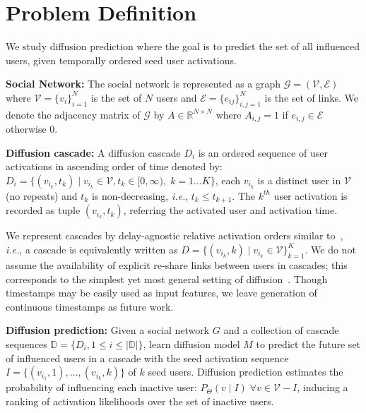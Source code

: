 \documentclass[sigconf]{acmart}
\def\gE{{\mathcal{E}}}
\def\gG{{\mathcal{G}}}
\def\gV{{\mathcal{V}}}
\def\sD{{\mathbb{D}}}
\def\sR{{\mathbb{R}}}
\begin{document}
\section{Problem Definition}
\label{sec:defn}
We study diffusion prediction where the goal is to predict the set of all influenced users, given temporally ordered seed user activations.
\begin{definition}\textbf{Social Network:} The social network is represented as a graph $\gG = (\gV,\gE)$ where $\gV = \{ v_i\}_{i=1}^N$ is the set of $N$ users and $\gE = \{ e_{ij} \}_{i,j=1}^N$ is the set of links. We denote the adjacency matrix of $\gG$ by $A \in \sR^{N \times N}$ where $A_{i,j} = 1$ if $e_{i,j} \in \gE$ otherwise 0.
\end{definition}
\vspace{-8pt}
\begin{definition}\textbf{Diffusion cascade:} A diffusion cascade $D_i$ is an ordered sequence of user activations in ascending order of time denoted by: $D_i = \{ (v_{i_k}, t_k) \mid v_{i_k} \in \gV, t_k \in [0, \infty), \; k = 1\dots K\}$, each $v_{i_k}$ is a distinct user in $\gV$ (no repeats) 
and $t_k$ is non-decreasing, \textit{i.e.}, $t_k \leq t_{k+1}$. The $k^{th}$ user activation is recorded as tuple $(v_{i_k}, t_k)$, referring the activated user and activation time. 
\end{definition}
\vspace{-3pt}
We represent cascades by delay-agnostic relative activation orders similar to~\cite{inf2vec,topolstm,wsdm16}, \textit{i.e.}, a cascade is equivalently written as $D = \{(v_{i_k} , k) \mid v_{i_k} \in \gV\}_{k=1}^K$. We do not assume the availability of explicit re-share links between users in cascades; this corresponds to the simplest yet most general setting of diffusion~\cite{topolstm,inf2vec}.
Though timestamps may be easily used as input features, we leave generation of continuous timestamps as future work.
\vspace{-5pt}
\begin{definition} \textbf{Diffusion prediction:}
Given a social network $G$ and a collection of cascade sequences $\sD = \{D_i, 1 \leq i \leq |\sD|\}$, learn diffusion model $M$ to predict the future set of influenced users in a cascade with the seed activation sequence $I = \{(v_{i_1}, 1), \dots, (v_{i_k},k) \}$ of $k$ seed users. Diffusion prediction estimates the probability of influencing each inactive user: $P_\Theta(v \mid I) \; \forall v \in \gV -  I$, inducing a ranking of activation likelihoods over the set of inactive users. \vspace{-3pt}
\end{definition}
\end{document}
